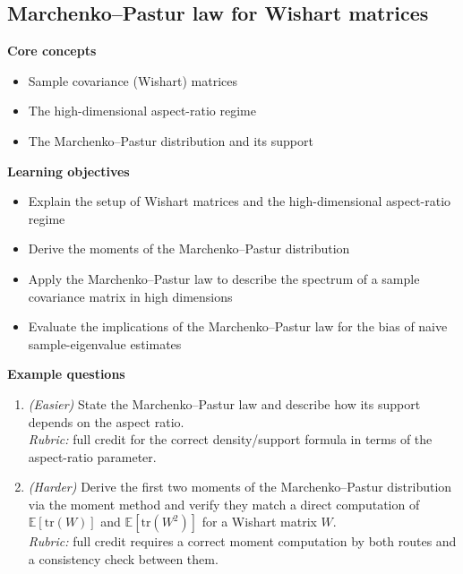 \documentclass[11pt]{article}
\begin{document}
\subsection{Marchenko--Pastur law for Wishart matrices}
\textbf{Core concepts}
\begin{itemize}[nosep]
\item Sample covariance (Wishart) matrices
\item The high-dimensional aspect-ratio regime
\item The Marchenko--Pastur distribution and its support
\end{itemize}
\textbf{Learning objectives}
\begin{itemize}[nosep]
\item Explain the setup of Wishart matrices and the high-dimensional aspect-ratio regime
\item Derive the moments of the Marchenko--Pastur distribution
\item Apply the Marchenko--Pastur law to describe the spectrum of a sample covariance matrix in high dimensions
\item Evaluate the implications of the Marchenko--Pastur law for the bias of naive sample-eigenvalue estimates
\end{itemize}
\textbf{Example questions}
\begin{enumerate}[nosep]
\item \emph{(Easier)} State the Marchenko--Pastur law and describe how its support depends on the aspect ratio. \\
\emph{Rubric:} full credit for the correct density/support formula in terms of the aspect-ratio parameter.
\item \emph{(Harder)} Derive the first two moments of the Marchenko--Pastur distribution via the moment method and verify they match a direct computation of $\mathbb{E}[\mathrm{tr}(W)]$ and $\mathbb{E}[\mathrm{tr}(W^2)]$ for a Wishart matrix $W$. \\
\emph{Rubric:} full credit requires a correct moment computation by both routes and a consistency check between them.
\end{enumerate}
\end{document}
